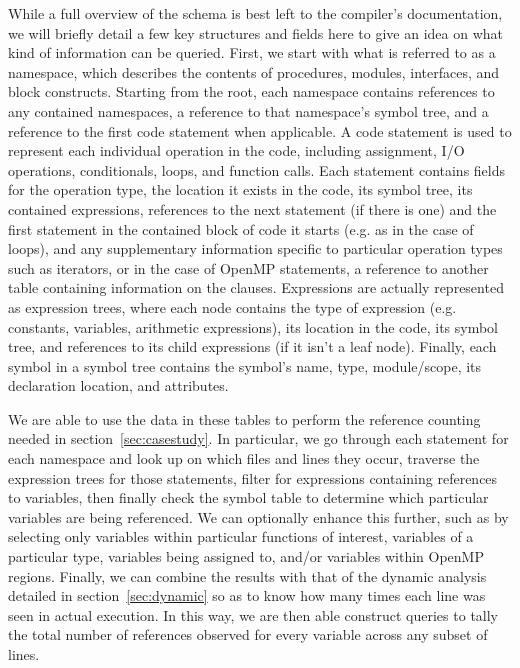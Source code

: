 While a full overview of the schema is best left to the compiler's documentation, we will briefly detail a few key structures and fields here to give an idea on what kind of information can be queried.
First, we start with what is referred to as a namespace, which describes the contents of procedures, modules, interfaces, and block constructs.
Starting from the root, each namespace contains references to any contained namespaces, a reference to that namespace's symbol tree, and a reference to the first code statement when applicable.
A code statement is used to represent each individual operation in the code, including assignment, \acs{I/O} operations, conditionals, loops, and function calls.
Each statement contains fields for the operation type, the location it exists in the code, its symbol tree, its contained expressions, references to the next statement (if there is one) and the first statement in the contained block of code it starts (e.g. as in the case of loops), and any supplementary information specific to particular operation types such as iterators, or in the case of OpenMP statements, a reference to another table containing information on the clauses.
Expressions are actually represented as expression trees, where each node contains the type of expression (e.g. constants, variables, arithmetic expressions), its location in the code, its symbol tree, and references to its child expressions (if it isn't a leaf node).
Finally, each symbol in a symbol tree contains the symbol's name, type, module/scope, its declaration location, and attributes.

We are able to use the data in these tables to perform the reference counting needed in section~\ref{sec:casestudy}.
In particular, we go through each statement for each namespace and look up on which files and lines they occur, traverse the expression trees for those statements, filter for expressions containing references to variables, then finally check the symbol table to determine which particular variables are being referenced.
We can optionally enhance this further, such as by selecting only variables within particular functions of interest, variables of a particular type, variables being assigned to, and/or variables within OpenMP regions.
Finally, we can combine the results with that of the dynamic analysis detailed in section~\ref{sec:dynamic} so as to know how many times each line was seen in actual execution.
In this way, we are then able construct queries to tally the total number of references observed for every variable across any subset of lines.

